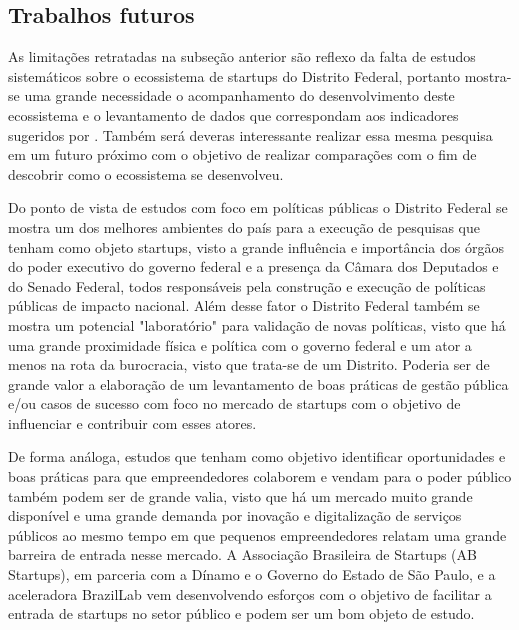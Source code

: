 \subsection{Trabalhos futuros}
\label{subsection:trabalhos_futuros}

As limitações retratadas na subseção anterior são reflexo da falta de estudos sistemáticos sobre o ecossistema de startups do Distrito Federal, portanto mostra-se uma grande necessidade o acompanhamento do desenvolvimento deste ecossistema e o levantamento de dados que correspondam aos indicadores sugeridos por . Também será deveras interessante realizar essa mesma pesquisa em um futuro próximo com o objetivo de realizar comparações com o fim de descobrir como o ecossistema se desenvolveu.

Do ponto de vista de estudos com foco em políticas públicas o Distrito Federal se mostra um dos melhores ambientes do país para a execução de pesquisas que tenham como objeto startups, visto a grande influência e importância dos órgãos do poder executivo do governo federal e a presença da Câmara dos Deputados e do Senado Federal, todos responsáveis pela construção e execução de políticas públicas de impacto nacional. Além desse fator o Distrito Federal também se mostra um potencial "laboratório" para validação de novas políticas, visto que há uma grande proximidade física e política com o governo federal e um ator a menos na rota da burocracia, visto que trata-se de um Distrito. Poderia ser de grande valor a elaboração de um levantamento de boas práticas de gestão pública e/ou casos de sucesso com foco no mercado de startups com o objetivo de influenciar e contribuir com esses atores. 

De forma análoga, estudos que tenham como objetivo identificar oportunidades e boas práticas para que empreendedores colaborem e vendam para o poder público também podem ser de grande valia, visto que há um mercado muito grande disponível e uma grande demanda por inovação e digitalização de serviços públicos ao mesmo tempo em que pequenos empreendedores relatam uma grande barreira de entrada nesse mercado. A Associação Brasileira de Startups (AB Startups), em parceria com a Dínamo e o Governo do Estado de São Paulo, e a aceleradora BrazilLab vem desenvolvendo esforços com o objetivo de facilitar a entrada de startups no setor público e podem ser um bom objeto de estudo.